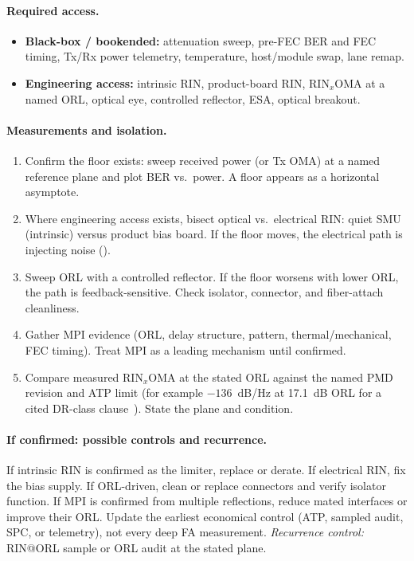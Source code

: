\paragraph{Required access.}
\begin{itemize}
\item \textbf{Black-box / bookended:} attenuation sweep, pre-FEC BER and FEC
      timing, Tx/Rx power telemetry, temperature, host/module swap, lane remap.
\item \textbf{Engineering access:} intrinsic RIN, product-board RIN,
      $\mathrm{RIN}_x\mathrm{OMA}$ at a named ORL, optical eye, controlled
      reflector, ESA, optical breakout.
\end{itemize}

\paragraph{Measurements and isolation.}
\begin{enumerate}
\item Confirm the floor exists: sweep received power (or Tx OMA) at a named
      reference plane and plot BER vs.\ power. A floor appears as a horizontal
      asymptote.
\item Where engineering access exists, bisect optical vs.\ electrical RIN: quiet
      SMU (intrinsic) versus product bias board. If the floor moves, the electrical
      path is injecting noise ().
\item Sweep ORL with a controlled reflector. If the floor worsens with lower ORL,
      the path is feedback-sensitive. Check isolator, connector, and fiber-attach
      cleanliness.
\item Gather MPI evidence (ORL, delay structure, pattern, thermal/mechanical, FEC
      timing). Treat MPI as a leading mechanism until confirmed.
\item Compare measured $\mathrm{RIN}_x\mathrm{OMA}$ at the stated ORL against the
      named PMD revision and ATP limit (for example $-136$~dB/Hz at 17.1~dB ORL for
      a cited DR-class clause~\cite{rinspec}). State the plane and condition.
\end{enumerate}

\paragraph{If confirmed: possible controls and recurrence.}
If intrinsic RIN is confirmed as the limiter, replace or derate. If electrical
RIN, fix the bias supply. If ORL-driven, clean or replace connectors and verify
isolator function. If MPI is confirmed from multiple reflections, reduce mated
interfaces or improve their ORL. Update the earliest economical control (ATP,
sampled audit, SPC, or telemetry), not every deep FA measurement.
\emph{Recurrence control:} RIN@ORL sample or ORL audit at the stated plane.

